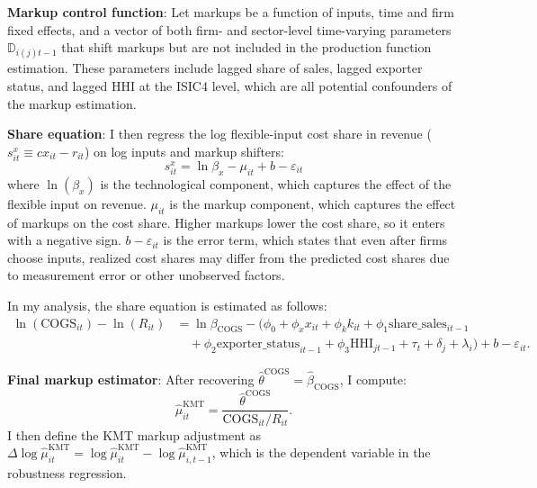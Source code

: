 ﻿\documentclass[12pt]{article}
\begin{document}
\textbf{Markup control function}: Let markups be a function of inputs, time and firm fixed effects, and a vector of both firm- and sector-level time-varying parameters $\mathbb{D}_{i(j)t-1}$ that shift markups but are not included in the production function estimation. These parameters include lagged share of sales, lagged exporter status, and lagged HHI at the ISIC4 level, which are all potential confounders of the markup estimation. 

\textbf{Share equation}: I then regress the log flexible-input cost share in revenue ($s^x_{it} \equiv cx_{it} - r_{it}$) on log inputs and markup shifters:
\[s^x_{it} = \ln \beta_x - \mu_{it} + b - \varepsilon_{it}\]
where $\ln(\beta_x)$ is the technological component, which captures the effect of the flexible input on revenue. $\mu_{it}$ is the markup component, which captures the effect of markups on the cost share. Higher markups lower the cost share, so it enters with a negative sign. $b-\varepsilon_{it}$ is the error term, which states that even after firms choose inputs, realized cost shares may differ from the predicted cost shares due to measurement error or other unobserved factors.

In my analysis, the share equation is estimated as follows:
\[
\begin{aligned}
\ln(\text{COGS}_{it}) - \ln(R_{it})
&= \ln \beta_{\text{COGS}}
- \big(\phi_0 + \phi_x x_{it} + \phi_k k_{it}
+ \phi_1 \text{share\_sales}_{it-1} \\
&\quad
+ \phi_2 \text{exporter\_status}_{it-1}
+ \phi_3 \text{HHI}_{jt-1}
+ \tau_t + \delta_j + \lambda_i \big)
+ b - \varepsilon_{it}.
\end{aligned}
\]

\textbf{Final markup estimator}: After recovering $\hat{\theta}^{\text{COGS}} = \hat{\beta}_{\text{COGS}}$, I compute: 
\[
\hat{\mu}_{it}^{\mathrm{KMT}}
=
\frac{\hat{\theta}^{\text{COGS}}}{\text{COGS}_{it}/R_{it}}.
\]
I then define the KMT markup adjustment as \(\Delta \log \hat{\mu}_{it}^{\mathrm{KMT}} = \log \hat{\mu}_{it}^{\mathrm{KMT}} - \log \hat{\mu}_{i,t-1}^{\mathrm{KMT}}\), which is the dependent variable in the robustness regression.
\end{document}
